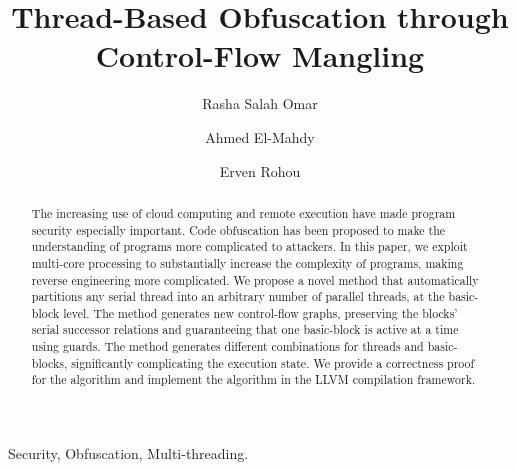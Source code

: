 \documentclass[3p,times,procedia,twocolumn,letterpaper]{elsarticle}
\begin{document}
\begin{frontmatter}



\title{Thread-Based Obfuscation through Control-Flow Mangling}








\author{Rasha Salah Omar}

\author{Ahmed El-Mahdy}


\author{Erven Rohou}







  

\begin{abstract}

The increasing use of cloud computing and remote execution have made program security especially important. Code obfuscation has been proposed to make the understanding of programs more complicated to attackers. In this paper, we exploit multi-core processing to substantially increase the complexity of programs, making reverse engineering more complicated. We propose a novel method that automatically partitions any serial thread into an arbitrary number of parallel threads, at the basic-block level. The method generates new control-flow graphs, preserving the blocks' serial successor relations and guaranteeing that one basic-block is active at a time using guards. The method generates  different combinations for  threads and  basic-blocks, significantly complicating the execution state. We provide a correctness proof for the algorithm and implement the algorithm in the LLVM compilation framework.
\end{abstract}

\begin{keyword}
Security, Obfuscation, Multi-threading.
\end{keyword}


\end{frontmatter}
\end{document}
